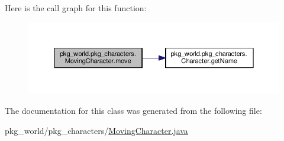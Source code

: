 Here is the call graph for this function\-:
\nopagebreak
\begin{figure}[H]
\begin{center}
\leavevmode
\includegraphics[width=350pt]{classpkg__world_1_1pkg__characters_1_1MovingCharacter_aaf4df04191a12b44ecf4d5e127c3a969_cgraph}
\end{center}
\end{figure}




The documentation for this class was generated from the following file\-:\begin{DoxyCompactItemize}
\item 
pkg\-\_\-world/pkg\-\_\-characters/\hyperlink{MovingCharacter_8java}{Moving\-Character.\-java}\end{DoxyCompactItemize}
